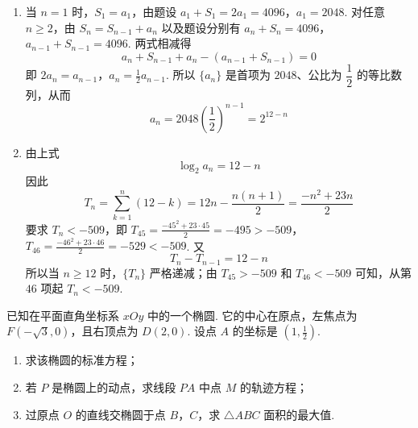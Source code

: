 \begin{solution}
\begin{enumerate}
\item 当 \(n=1\) 时，\(S_1=a_1\)，由题设
\(a_1+S_1=2a_1=4096\)，\(a_1=2048\).
对任意 \(n\geqslant2\)，由 \(S_n=S_{n-1}+a_n\) 以及题设分别有
\(a_n+S_n=4096\)，\(a_{n-1}+S_{n-1}=4096\).
两式相减得
\[
a_n+S_{n-1}+a_n-\left(a_{n-1}+S_{n-1}\right)=0
\]
即
\(2a_n=a_{n-1}\)，\(a_n=\frac12a_{n-1}\).
所以 \(\{a_n\}\) 是首项为 \(2048\)、公比为 \(\dfrac12\) 的等比数列，从而
\[
a_n=2048\left(\frac12\right)^{n-1}=2^{12-n}
\]
\item 由上式
\[
\log_2a_n=12-n
\]
因此
\[
T_n=\sum_{k=1}^{n}(12-k)
=12n-\frac{n(n+1)}2
=\frac{-n^2+23n}{2}
\]
要求 \(T_n<-509\)，即
\(T_{45}=\frac{-45^2+23\cdot45}{2}=-495>-509\)，\(T_{46}=\frac{-46^2+23\cdot46}{2}=-529<-509\).
又
\[
T_n-T_{n-1}=12-n
\]
所以当 \(n\geqslant12\) 时，\(\{T_n\}\) 严格递减；由 \(T_{45}>-509\) 和
\(T_{46}<-509\) 可知，从第 \(46\) 项起 \(T_n<-509\).
\end{enumerate}
\end{solution}

\begin{problem}
已知在平面直角坐标系 \(xOy\) 中的一个椭圆. 它的中心在原点，左焦点为 \(F(-\sqrt{3}, 0)\)，且右顶点为 \(D(2, 0)\). 设点 \(A\) 的坐标是 \(\left(1, \frac{1}{2}\right)\).
\begin{enumerate}
\item 求该椭圆的标准方程；
\item 若 \(P\) 是椭圆上的动点，求线段 \(PA\) 中点 \(M\) 的轨迹方程；
\item 过原点 \(O\) 的直线交椭圆于点 \(B\)，\(C\)，求 \(\triangle ABC\) 面积的最大值.
\end{enumerate}
\end{problem}

